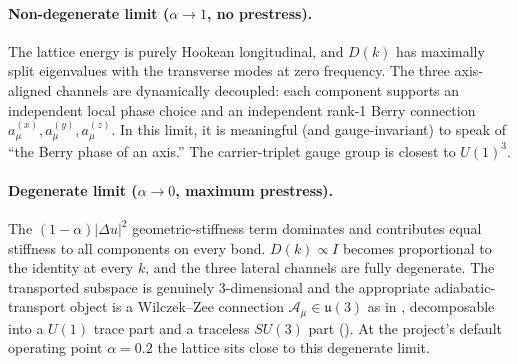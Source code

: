\paragraph{Non-degenerate limit ($\alpha\to 1$, no prestress).}
The lattice energy is purely Hookean longitudinal, and $D(k)$ has maximally split eigenvalues with the transverse modes
at zero frequency. The three axis-aligned channels are dynamically decoupled: each component supports an independent
local phase choice and an independent rank-1 Berry connection $a_\mu^{(x)},a_\mu^{(y)},a_\mu^{(z)}$.
In this limit, it is meaningful (and gauge-invariant) to speak of ``the Berry phase of an axis.''
The carrier-triplet gauge group is closest to $U(1)^3$.

\paragraph{Degenerate limit ($\alpha\to 0$, maximum prestress).}
The $(1-\alpha)|\Delta u|^2$ geometric-stiffness term dominates and contributes equal stiffness to all components on
every bond. $D(k)\propto I$ becomes proportional to the identity at every $k$, and the three lateral channels are fully
degenerate. The transported subspace is genuinely 3-dimensional and the appropriate adiabatic-transport object is a
Wilczek--Zee connection $\mathcal{A}_\mu\in\mathfrak{u}(3)$ as in , decomposable
into a $U(1)$ trace part and a traceless $SU(3)$ part ().
At the project's default operating point $\alpha=0.2$ the lattice sits close to this degenerate limit.

